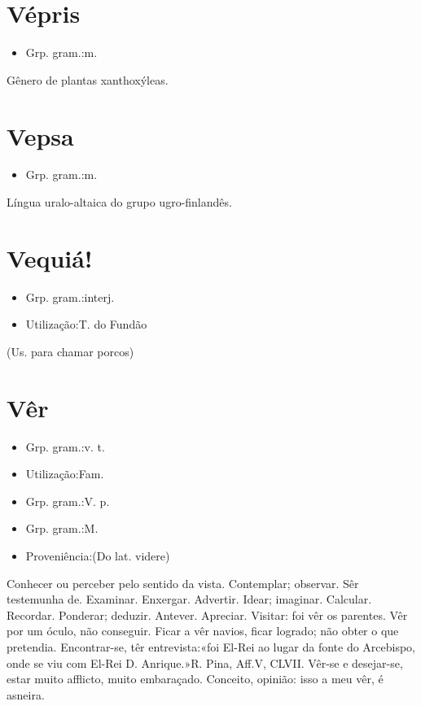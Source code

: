 \documentclass{article}
\begin{document}
\section{Vépris}
\begin{itemize}
\item {Grp. gram.:m.}
\end{itemize}
Gênero de plantas xanthoxýleas.
\section{Vepsa}
\begin{itemize}
\item {Grp. gram.:m.}
\end{itemize}
Língua uralo-altaica do grupo ugro-finlandês.
\section{Vequiá!}
\begin{itemize}
\item {Grp. gram.:interj.}
\end{itemize}
\begin{itemize}
\item {Utilização:T. do Fundão}
\end{itemize}
(Us. para chamar porcos)
\section{Vêr}
\begin{itemize}
\item {Grp. gram.:v. t.}
\end{itemize}
\begin{itemize}
\item {Utilização:Fam.}
\end{itemize}
\begin{itemize}
\item {Grp. gram.:V. p.}
\end{itemize}
\begin{itemize}
\item {Grp. gram.:M.}
\end{itemize}
\begin{itemize}
\item {Proveniência:(Do lat. \textunderscore videre\textunderscore )}
\end{itemize}
Conhecer ou perceber pelo sentido da vista.
Contemplar; observar.
Sêr testemunha de.
Examinar.
Enxergar.
Advertir.
Idear; imaginar.
Calcular.
Recordar.
Ponderar; deduzir.
Antever.
Apreciar.
Visitar: \textunderscore foi vêr os parentes\textunderscore .
\textunderscore Vêr por um óculo\textunderscore , não conseguir.
\textunderscore Ficar a vêr navios\textunderscore , ficar logrado; não obter o que pretendia.
Encontrar-se, têr entrevista:«\textunderscore foi El-Rei ao lugar da fonte do Arcebispo, onde se viu com El-Rei D. Anrique.\textunderscore »R. Pina, \textunderscore Aff.\textunderscore  V, CLVII.
\textunderscore Vêr-se e desejar-se\textunderscore , estar muito afflicto, muito embaraçado.
Conceito, opinião: \textunderscore isso a meu vêr, é asneira\textunderscore .
\end{document}
